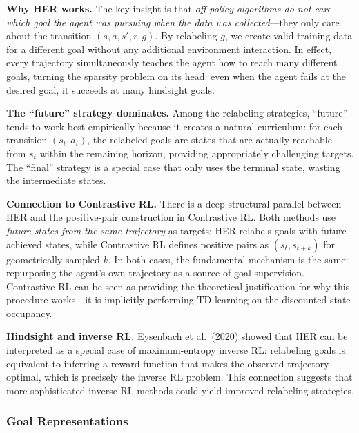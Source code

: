 \documentclass[11pt, letterpaper]{article}
\begin{document}
\begin{remark}
    \textbf{Why HER works.} The key insight is that \textit{off-policy algorithms do not care which goal the agent was pursuing when the data was collected}---they only care about the transition \((s, a, s', r, g)\). By relabeling \(g\), we create valid training data for a different goal without any additional environment interaction. In effect, every trajectory simultaneously teaches the agent how to reach many different goals, turning the sparsity problem on its head: even when the agent fails at the desired goal, it succeeds at many hindsight goals.
 
    \textbf{The ``future'' strategy dominates.} Among the relabeling strategies, ``future'' tends to work best empirically because it creates a natural curriculum: for each transition \((s_t, a_t)\), the relabeled goals are states that are actually reachable from \(s_t\) within the remaining horizon, providing appropriately challenging targets. The ``final'' strategy is a special case that only uses the terminal state, wasting the intermediate states.
 
    \textbf{Connection to Contrastive RL.} There is a deep structural parallel between HER and the positive-pair construction in Contrastive RL. Both methods use \textit{future states from the same trajectory} as targets: HER relabels goals with future achieved states, while Contrastive RL defines positive pairs as \((s_t, s_{t+k})\) for geometrically sampled \(k\). In both cases, the fundamental mechanism is the same: repurposing the agent's own trajectory as a source of goal supervision. Contrastive RL can be seen as providing the theoretical justification for why this procedure works---it is implicitly performing TD learning on the discounted state occupancy.
 
    \textbf{Hindsight and inverse RL.} Eysenbach et al.\ (2020) showed that HER can be interpreted as a special case of maximum-entropy inverse RL: relabeling goals is equivalent to inferring a reward function that makes the observed trajectory optimal, which is precisely the inverse RL problem. This connection suggests that more sophisticated inverse RL methods could yield improved relabeling strategies.
\end{remark}
 
\subsubsection{Goal Representations}
 
\end{document}
